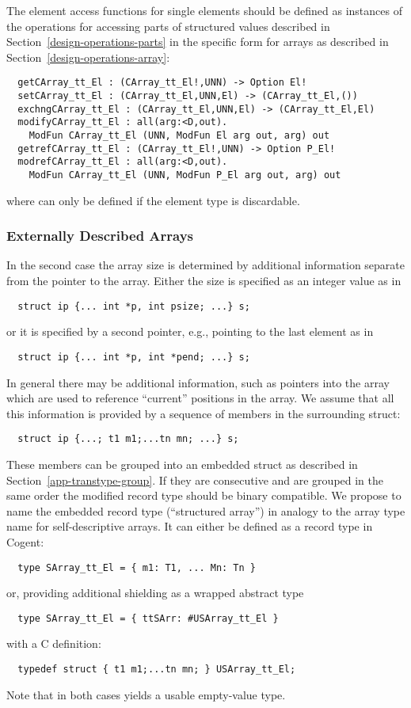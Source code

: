 The element access functions for single elements should be defined as instances of the operations for accessing parts 
of structured values described in Section~\ref{design-operations-parts} in the specific form for arrays as described
in Section~\ref{design-operations-array}:
\begin{verbatim}
  getCArray_tt_El : (CArray_tt_El!,UNN) -> Option El!
  setCArray_tt_El : (CArray_tt_El,UNN,El) -> (CArray_tt_El,())
  exchngCArray_tt_El : (CArray_tt_El,UNN,El) -> (CArray_tt_El,El)
  modifyCArray_tt_El : all(arg:<D,out). 
    ModFun CArray_tt_El (UNN, ModFun El arg out, arg) out
  getrefCArray_tt_El : (CArray_tt_El!,UNN) -> Option P_El!
  modrefCArray_tt_El : all(arg:<D,out). 
    ModFun CArray_tt_El (UNN, ModFun P_El arg out, arg) out
\end{verbatim}
where  can only be defined if the element type  is discardable.

\subsubsection{Externally Described Arrays}

In the second case the array size is determined by additional information separate from the pointer to the array.
Either the size is specified as an integer value as in 
\begin{verbatim}
  struct ip {... int *p, int psize; ...} s;
\end{verbatim}
or it is specified by a second pointer, e.g., pointing to the last element as in
\begin{verbatim}
  struct ip {... int *p, int *pend; ...} s;
\end{verbatim}
In general there may be additional information, such as pointers into the array which are used to reference
``current'' positions in the array. We assume that all this information is provided by a sequence of members
in the surrounding struct:
\begin{verbatim}
  struct ip {...; t1 m1;...tn mn; ...} s;
\end{verbatim}

These members can be grouped into an embedded struct as described in Section~\ref{app-transtype-group}. If they
are consecutive and are grouped in the same order the modified record type should be binary compatible.
We propose to name the embedded record type  (``structured array'') in analogy to the
array type name for self-descriptive arrays. It can either be defined as a record type in Cogent:
\begin{verbatim}
  type SArray_tt_El = { m1: T1, ... Mn: Tn }
\end{verbatim}
or, providing additional shielding as a wrapped abstract type 
\begin{verbatim}
  type SArray_tt_El = { ttSArr: #USArray_tt_El }
\end{verbatim}
with a C definition:
\begin{verbatim}
  typedef struct { t1 m1;...tn mn; } USArray_tt_El;
\end{verbatim}
Note that in both cases  yields a usable empty-value type.

